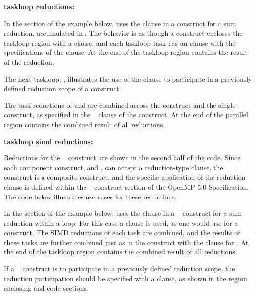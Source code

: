 \textbf{taskloop reductions:}

In the  section of the example below, 
 uses the  clause 
in a  construct for a sum reduction, accumulated in . 
The behavior is as though a  construct encloses the 
taskloop region with a  clause, and each taskloop
task has an  clause with the specifications 
of the  clause.
At the end of the taskloop region  contains the result of the reduction.

The next taskloop, , illustrates the use of the 
 clause to participate in a previously defined
reduction scope of a  construct.

The task reductions of  and  are combined
across the  construct and the single  construct, as specified
in the ~ clause of the  construct.
At the end of the parallel region  contains the combined result of all reductions.

\textbf{taskloop simd reductions:}

Reductions for the ~ construct are shown in the second half of the code.
Since each component construct,  and , 
can accept a reduction-type clause, the ~ construct
is a composite construct, and the specific application of the reduction clause is defined
within the ~ construct section of the OpenMP 5.0 Specification.
The code below illustrates use cases for these reductions.

In the  section of the example below,
 uses the  clause 
in a ~ construct for a sum reduction within a loop.
For this case a  clause is used, as one would use 
for a  construct.
The SIMD reductions of each task are combined, and the results of these tasks are further 
combined just as in the  construct with the  clause for .
At the end of the taskloop region  contains the combined result of all reductions.

If a ~ construct is to participate in a previously defined 
reduction scope, the reduction participation should be specified with
a  clause, as shown in the  region enclosing
 and  code sections.  

